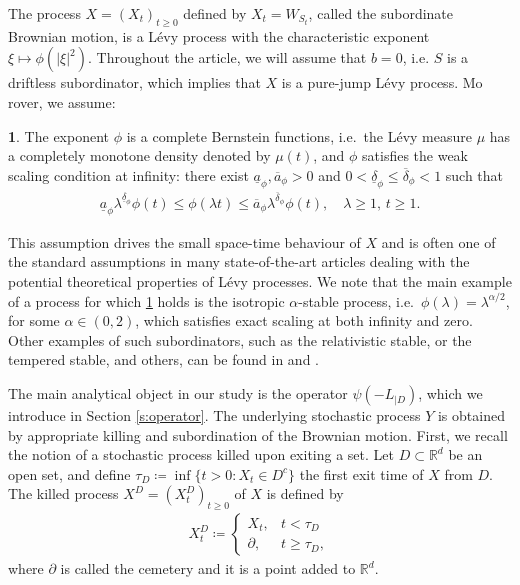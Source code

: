 \documentclass[12pt,a4paper,onecolumn]{article}
\makeatletter
\theoremstyle{definition}
\newtheorem*{assumption*}{\assumptionnumber}
\providecommand{\assumptionnumber}{}
\newenvironment{assumption}[2]
{%
	\renewcommand{\assumptionnumber}{(\textbf{#1#2})}%
	\begin{assumption*}%
		\protected@edef\@currentlabel{(\textbf{#1#2})}%
	}
	{%
	\end{assumption*}
}
\newcommand{\R}{\mathbb{R}}
\newcommand{\1}{\mathbf 1}
\newcommand{\ua}[1]{\underline{a}_{#1}}
\newcommand{\oa}[1]{\overline{a}_{#1}}
\newcommand{\ud}[1]{\underline{\delta}_{#1}}
\newcommand{\od}[1]{\overline{\delta}_{#1}}
\newcommand{\Lo}{\psi(-L_{|D})}
\numberwithin{equation}{section}
\makeatother
\begin{document}
    The process $X=(X_t)_{t\ge 0}$ defined by $X_t=W_{S_t}$, called the subordinate Brownian motion, is a L\'evy process with the characteristic exponent $\xi \mapsto \phi(|\xi|^2)$. Throughout the article, we will assume that $b=0$, i.e. $S$ is a driftless subordinator, which implies that $X$ is a pure-jump L\'evy process. Mo rover, we assume:
    \begin{assumption}{A}{1}\label{as:WSC}
        The exponent $\phi$ is a complete Bernstein functions, i.e.~the L\'evy measure $\mu$ has a completely monotone density denoted by $\mu(t)$, and $\phi$ satisfies the weak scaling condition at infinity: there exist $\ua{\phi},\oa{\phi}>0$ and $0< \ud{\phi}\le \od{\phi}<1$ such that
        \begin{align}\label{eq:WSC}
            \ua{\phi} \lambda^{\ud{\phi}} \phi(t)\le \phi(\lambda t)\le \oa{\phi}
            \lambda^{\od{\phi}}\phi(t),\quad \lambda\ge 1, \, t\ge 1.
        \end{align}
    \end{assumption}
    This assumption drives the small space-time behaviour of $X$ and is often one of the standard assumptions in many state-of-the-art articles dealing with the potential theoretical properties of L\'evy processes. We note that the main example of a process for which \ref{as:WSC} holds is the isotropic $\alpha$-stable process, i.e.~$\phi(\lambda)=\lambda^{\alpha/2}$, for some $\alpha\in (0,2)$, which satisfies exact scaling at both infinity and zero. Other examples of such subordinators, such as the relativistic stable, or the tempered stable, and others, can be found in \cite[p. 409]{KSV_bhpinf-PA14} and \cite[p. 41]{KSV_heat-PA18}.

    The main analytical object in our study is the operator $\Lo$, which we introduce in Section \ref{s:operator}. The underlying stochastic process $Y$ is obtained by appropriate killing and subordination of the Brownian motion. First, we recall the notion of a stochastic process killed upon exiting a set. Let $D\subset \R^d$ be an open set, and define $\tau_D\coloneqq \inf\{t>0:X_t\in D^c\}$ the first exit time of $X$ from $D$. The killed process $X^D=(X^D_t)_{t\ge 0}$ of $X$ is defined by
    \begin{align*}
        X^D_t\coloneqq \begin{cases}
            X_t, &t<\tau_D\\
            \partial, &t\ge \tau_D,
        \end{cases}
    \end{align*}
    where $\partial$ is called the cemetery and it is a point added to $\R^d$. 
\end{document}
